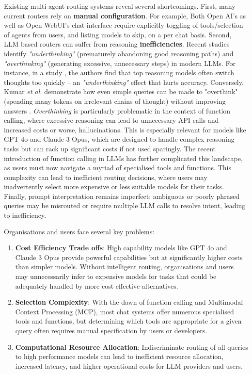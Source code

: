 Existing multi agent routing systems reveal several shortcomings. First, many current routers rely on \textbf{manual configuration}. For example, Both Open AI's as well as Open WebUI's chat interface require explicitly toggling of tools/selection of agents from users, and listing models to skip, on a per chat basis. Second, LLM based routers can suffer from reasoning \textbf{inefficiencies}. Recent studies identify \textit{"underthinking"} (prematurely abandoning good reasoning paths) and \textit{"overthinking"} (generating excessive, unnecessary steps) in modern LLMs. For instance, in a study \cite{wang2025thoughtsplaceunderthinkingo1like}, the authors find that top reasoning models often switch thoughts too quickly – an \textit{"underthinking"} effect that hurts accuracy. Conversely, Kumar \textit{et al.} demonstrate how even simple queries can be made to "overthink" (spending many tokens on irrelevant chains of thought) without improving answers \cite{kumar2025overthinkslowdownattacksreasoning}. \textit{Overthinking} is particularly problematic in the context of function calling, where excessive reasoning can lead to unnecessary API calls and increased costs or worse, hallucinations. This is especially relevant for models like GPT 4o and Claude 3 Opus, which are designed to handle complex reasoning tasks but can rack up significant costs if not used sparingly. The recent introduction of function calling in LLMs has further complicated this landscape, as users must now navigate a myriad of specialised tools and functions. This complexity can lead to inefficient routing decisions, where users may inadvertently select more expensive or less suitable models for their tasks. Finally, prompt interpretation remains imperfect: ambiguous or poorly phrased queries may be misrouted or require multiple LLM calls to resolve intent, leading to inefficiency.

Organisations and users face several key problems:
\begin{enumerate}
    \item \textbf{Cost Efficiency Trade offs}: High capability models like GPT 4o and Claude 3 Opus provide powerful capabilities but at significantly higher costs than simpler models. Without intelligent routing, organisations and users may unnecessarily infer to expensive models for tasks that could be adequately handled by more cost effective alternatives.
    
    \item \textbf{Selection Complexity}: With the dawn of function calling and Multimodal Context Processing (MCP), most chat systems offer numerous specialised tools and functions, but determining which tools are appropriate for a given query often requires manual specification by users or developers.
    
    \item \textbf{Computational Resource Allocation}: Indiscriminate routing of all queries to high performance models can lead to inefficient resource allocation, increased latency, and higher operational costs for LLM providers and users.
\end{enumerate}

